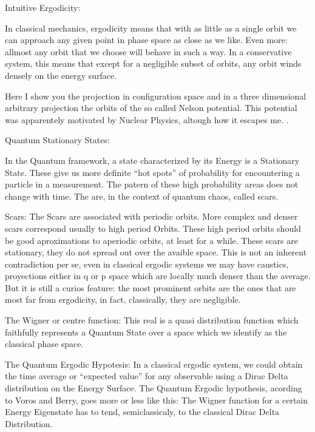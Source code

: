 Intuitive Ergodicity:

In classical mechanics, ergodicity means that
with as little as a single orbit we can approach any given point
in phase space as close as we like. Even more: allmost any
orbit that we choose will behave in such a way. In a conservative system,
this means that except for a negligible subset of orbits,
any orbit winds densely on the energy surface.
 
Here I show you the projection in configuration space
and in a three dimensional arbitrary projection the 
orbits of the so called Nelson potential. This potential was
apparentely motivated by Nuclear Physics, altough how it escapes me.
\cite{Baranger1987}.

Quantum Stationary States:

In the Quantum framework, a state characterized by its Energy
is a Stationary State. These give us more definite ``hot spots''
of probability for encountering a particle in a measurement. 
The patern of these high probability areas does not change with time.
The are, in the context of quantum chaos, called scars. 

Scars:
The Scars are associated with periodic orbits. More complex and denser scars
correspond usually to high period  Orbits. These high period orbits
should be good aproximations to aperiodic orbits, at least for a while. 
These scars are stationary, they do not spread out over the avaible
space. This is not an inherent contradiction per se, even in classical
ergodic systems we may have caustics, proyections either in q or p
space which are locally much denser than the average. But it is still
a curios feature: the most prominent orbits are the ones that are most
far from ergodicity, in fact, classically, they are negligible.

The Wigner or centre function:
This real is a quasi distribution function which faithfully represents
a Quantum State over a space which we identify as the classical phase space.  

The Quantum Ergodic Hypotesis:
In a classical ergodic system, we could obtain the time average
or ``expected value'' for any observable using a Dirac Delta distribution
on the Energy Surface. The Quantum Ergodic hypothesis, acording to Voros
and Berry, goes more or less like this: The Wigner function for a certain
Energy Eigenstate has to tend, semiclassicaly, to the classical Dirac
Delta Distribution.


